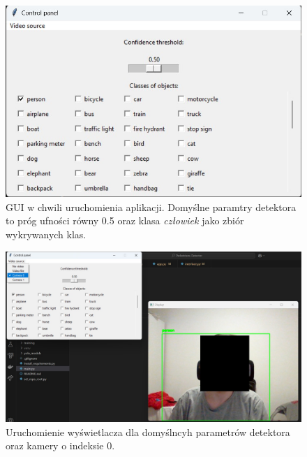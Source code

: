 \begin{figure}[H]
    \centering
    \includegraphics[width=\linewidth]{r_implementacja/panel_sterowania/panel_mockup.jpg}
    \caption{GUI w chwili uruchomienia aplikacji. Domyślne paramtry detektora to próg ufności równy 0.5 oraz klasa \emph{człowiek} jako zbiór wykrywanych klas.}
    \label{fig:mockup-2}
\end{figure}

\begin{figure}[H]
    \centering
    \includegraphics[width=\linewidth]{r_implementacja/panel_sterowania/camera_50.jpg}
    \caption{Uruchomienie wyświetlacza dla domyślncyh parametrów detektora oraz kamery o indeksie 0.}
    \label{fig:mockup-3}
\end{figure}

